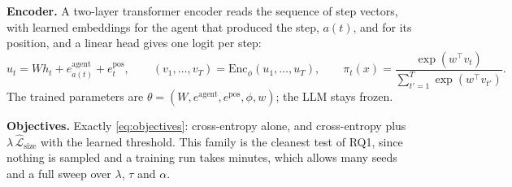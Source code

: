 \documentclass[10pt,a4paper]{article}
\newcommand{\Lcls}{\widehat{\mathcal L}_{\mathrm{cls}}}
\newcommand{\Lsize}{\widehat{\mathcal L}_{\mathrm{size}}}
\begin{document}
\textbf{Encoder.} A two-layer transformer encoder reads the sequence of step vectors, with learned embeddings for the agent that produced the step, $a(t)$, and for its position, and a linear head gives one logit per step:
\begin{equation}
u_t=Wh_t+e^{\mathrm{agent}}_{a(t)}+e^{\mathrm{pos}}_{t},\qquad (v_1,\dots,v_T)=\mathrm{Enc}_\phi(u_1,\dots,u_T),\qquad \pi_t(x)=\frac{\exp(w^{\top}v_t)}{\sum_{t'=1}^{T}\exp(w^{\top}v_{t'})}. \label{eq:encoder}
\end{equation}
The trained parameters are $\theta=(W,e^{\mathrm{agent}},e^{\mathrm{pos}},\phi,w)$; the LLM stays frozen.

\textbf{Objectives.} Exactly \eqref{eq:objectives}: cross-entropy alone, and cross-entropy plus $\lambda\,\Lsize$ with the learned threshold. This family is the cleanest test of RQ1, since nothing is sampled and a training run takes minutes, which allows many seeds and a full sweep over $\lambda$, $\tau$ and $\alpha$.

%
\end{document}
